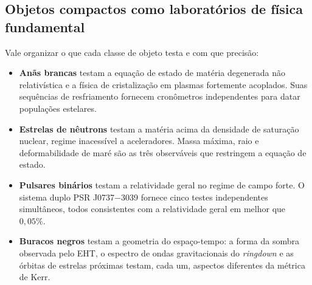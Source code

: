 \documentclass[11pt,a4paper]{article}
\begin{document}
\subsection*{Objetos compactos como laboratórios de física fundamental}

Vale organizar o que cada classe de objeto testa e com que precisão:

\begin{itemize}
\item \textbf{Anãs brancas} testam a equação de estado de matéria degenerada não relativística e a física de cristalização em plasmas fortemente acoplados. Suas sequências de resfriamento fornecem cronômetros independentes para datar populações estelares.
\item \textbf{Estrelas de nêutrons} testam a matéria acima da densidade de saturação nuclear, regime inacessível a aceleradores. Massa máxima, raio e deformabilidade de maré são as três observáveis que restringem a equação de estado.
\item \textbf{Pulsares binários} testam a relatividade geral no regime de campo forte. O sistema duplo PSR J0737$-$3039 fornece cinco testes independentes simultâneos, todos consistentes com a relatividade geral em melhor que $0{,}05\%$.
\item \textbf{Buracos negros} testam a geometria do espaço-tempo: a forma da sombra observada pelo EHT, o espectro de ondas gravitacionais do \textit{ringdown} e as órbitas de estrelas próximas testam, cada um, aspectos diferentes da métrica de Kerr.
\end{itemize}
\end{document}

